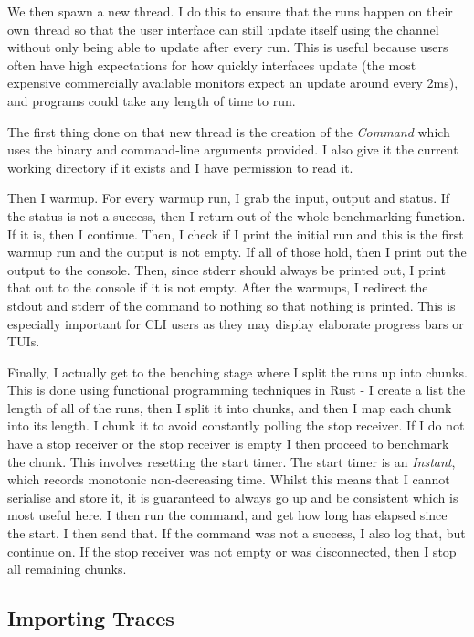 \documentclass{article}
\begin{document}
\begin{multicols*}{2}
We then spawn a new thread. I do this to ensure that the runs happen on their own thread so that the user interface can still update itself using the channel without only being able to update after every run. This is useful because users often have high expectations for how quickly interfaces update (the most expensive commercially available monitors expect an update around every 2ms), and programs could take any length of time to run.

The first thing done on that new thread is the creation of the \textit{Command} which uses the binary and command-line arguments provided. I also give it the current working directory if it exists and I have permission to read it.

Then I warmup. For every warmup run, I grab the input, output and status. If the status is not a success, then I return out of the whole benchmarking function. If it is, then I continue. Then, I check if I print the initial run and this is the first warmup run and the output is not empty. If all of those hold, then I print out the output to the console. Then, since stderr should always be printed out, I print that out to the console if it is not empty. After the warmups, I redirect the stdout and stderr of the command to nothing so that nothing is printed. This is especially important for CLI users as they may display elaborate progress bars or TUIs.

Finally, I actually get to the benching stage where I split the runs up into chunks. This is done using functional programming techniques in Rust - I create a list the length of all of the runs, then I split it into chunks, and then I map each chunk into its length. I chunk it to avoid constantly polling the stop receiver. If I do not have a stop receiver or the stop receiver is empty I then proceed to benchmark the chunk. This involves resetting the start timer. The start timer is an \textit{Instant}, which records monotonic non-decreasing time. Whilst this means that I cannot serialise and store it, it is guaranteed to always go up and be consistent which is most useful here. I then run the command, and get how long has elapsed since the start. I then send that. If the command was not a success, I also log that, but continue on. If the stop receiver was not empty or was disconnected, then I stop all remaining chunks.

\subsection{Importing Traces}


\end{multicols*}
\end{document}
